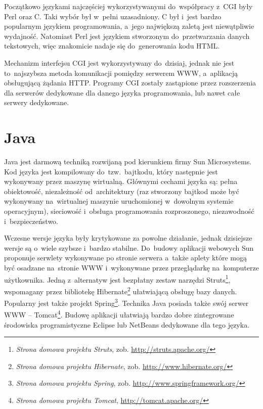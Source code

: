 \documentclass[a4paper,12pt,oneside]{report}
\begin{document}
Początkowo językami najczęściej wykorzystywanymi do~współpracy z~CGI były Perl oraz C. Taki wybór był w~pełni uzasadniony. C był i~jest bardzo popularnym językiem programowania, a~jego największą zaletą jest niewątpliwie wydajność. Natomiast Perl jest językiem stworzonym do~przetwarzania danych tekstowych, więc znakomicie nadaje się do~generowania kodu HTML.

Mechanizm interfejsu CGI jest wykorzystywany do~dzisiaj, jednak nie jest to~najszybsza metoda komunikacji pomiędzy serwerem WWW, a~aplikacją obsługującą żądania HTTP. Programy CGI zostały zastąpione przez rozszerzenia dla serwerów dedykowane dla danego języka programowania, lub nawet całe serwery dedykowane.

\section{Java}
\label{sec:java}
Java jest darmową techniką rozwijaną pod kierunkiem firmy Sun Microsystems. Kod języka jest kompilowany do~tzw.~bajtkodu, który następnie jest wykonywany przez maszynę wirtualną. Głównymi cechami języka są: pełna obiektowość, niezależność od~architektury (raz stworzony bajtkod może być wykonywany na~wirtualnej maszynie uruchomionej w~dowolnym systemie operacyjnym), sieciowość i~obsługa programowania rozproszonego, niezawodność i~bezpieczeństwo.

Wczesne wersje języka były krytykowane za powolne działanie, jednak dzisiejsze wersje są o~wiele szybsze i~bardzo stabilne. Do~budowy aplikacji webowych Sun proponuje serwlety wykonywane po stronie serwera a~także aplety które mogą być osadzane na~stronie WWW i~wykonywane przez przeglądarkę na~komputerze użytkownika. Jedną z~alternatyw jest bezpłatny zestaw narzędzi Struts\footnote{\emph{Strona domowa projektu Struts}, zob. \url{http://struts.apache.org/}}, wspomagany przez bibliotekę Hibernate\footnote{\emph{Strona domowa projektu Hibernate}, zob. \url{http://www.hibernate.org/}} ułatwiającą obsługę bazy danych. Popularny jest także projekt Spring\footnote{\emph{Strona domowa projektu Spring}, zob. \url{http://www.springframework.org/}}. Technika Java posiada także swój serwer WWW -- Tomcat\footnote{\emph{Strona domowa projektu Tomcat}, \url{http://tomcat.apache.org/}}. Budowę aplikacji ułatwiają bardzo dobre zintegrowane środowiska programistyczne Eclipse lub NetBeans dedykowane dla tego języka.
\end{document}
